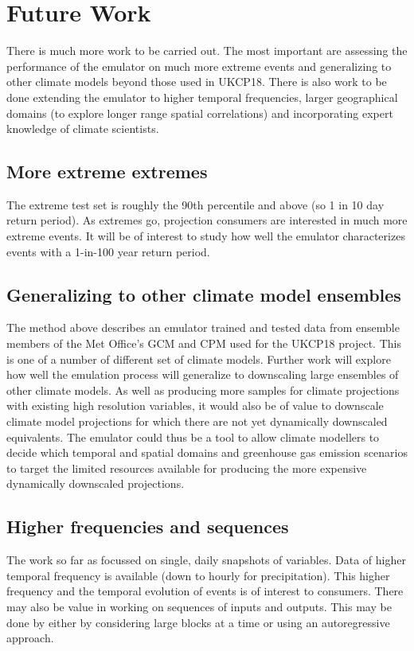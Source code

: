 \section{Future Work} \label{sec:future}

There is much more work to be carried out. The most important are assessing the performance of the emulator on much more extreme events and generalizing to other climate models beyond those used in UKCP18. There is also work to be done extending the emulator to higher temporal frequencies, larger geographical domains (to explore longer range spatial correlations) and incorporating expert knowledge of climate scientists.

\subsection{More extreme extremes}
The extreme test set is roughly the 90th percentile and above (so 1 in 10 day return period). As extremes go, projection consumers are interested in much more extreme events. It will be of interest to study how well the emulator characterizes events with a 1-in-100 year return period.

\subsection{Generalizing to other climate model ensembles}
The method above describes an emulator trained and tested data from ensemble members of the Met Office's GCM and CPM used for the UKCP18 project. This is one of a number of different set of climate models. Further work will explore how well the emulation process will generalize to downscaling large ensembles of other climate models. As well as producing more samples for climate projections with existing high resolution variables, it would also be of value to downscale climate model projections for which there are not yet dynamically downscaled equivalents. The emulator could thus be a tool to allow climate modellers to decide which temporal and spatial domains and greenhouse gas emission scenarios to target the limited resources available for producing the more expensive dynamically downscaled projections.

\subsection{Higher frequencies and sequences}
The work so far as focussed on single, daily snapshots of variables. Data of higher temporal frequency is available (down to hourly for precipitation). This higher frequency and the temporal evolution of events is of interest to consumers. There may also be value in working on sequences of inputs and outputs. This may be done by either by considering large blocks at a time or using an autoregressive approach.

